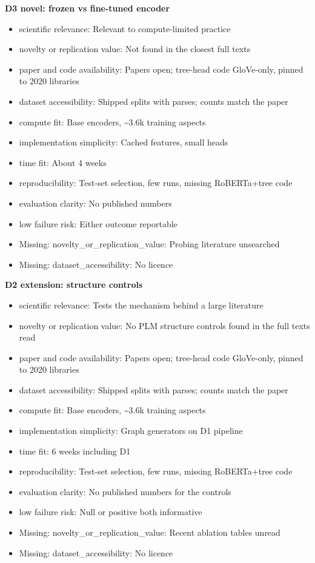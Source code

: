 \documentclass[11pt,a4paper]{article}
\begin{document}
\textbf{D3 novel: frozen vs fine-tuned encoder}
\begin{itemize}
\item scientific relevance: Relevant to compute-limited practice
\item novelty or replication value: Not found in the closest full texts
\item paper and code availability: Papers open; tree-head code GloVe-only, pinned to 2020 libraries
\item dataset accessibility: Shipped splits with parses; counts match the paper
\item compute fit: Base encoders, \textasciitilde{}3.6k training aspects
\item implementation simplicity: Cached features, small heads
\item time fit: About 4 weeks
\item reproducibility: Test-set selection, few runs, missing RoBERTa+tree code
\item evaluation clarity: No published numbers
\item low failure risk: Either outcome reportable
\item Missing: novelty\_or\_replication\_value: Probing literature unsearched
\item Missing: dataset\_accessibility: No licence
\end{itemize}

\textbf{D2 extension: structure controls}
\begin{itemize}
\item scientific relevance: Tests the mechanism behind a large literature
\item novelty or replication value: No PLM structure controls found in the full texts read
\item paper and code availability: Papers open; tree-head code GloVe-only, pinned to 2020 libraries
\item dataset accessibility: Shipped splits with parses; counts match the paper
\item compute fit: Base encoders, \textasciitilde{}3.6k training aspects
\item implementation simplicity: Graph generators on D1 pipeline
\item time fit: 6 weeks including D1
\item reproducibility: Test-set selection, few runs, missing RoBERTa+tree code
\item evaluation clarity: No published numbers for the controls
\item low failure risk: Null or positive both informative
\item Missing: novelty\_or\_replication\_value: Recent ablation tables unread
\item Missing: dataset\_accessibility: No licence
\end{itemize}
\end{document}
